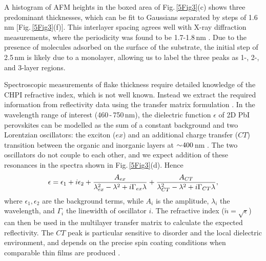 A histogram of AFM heights in the boxed area of Fig.\,\ref{5Fig3}(c) shows three predominant thicknesses, which can be fit to Gaussians separated by steps of 1.6\,nm [Fig.\,\ref{5Fig3}(f)]. This interlayer spacing agrees well with X-ray diffraction measurements, where the periodicity was found to be 1.7-1.8\,nm \cite{Billing2006b, Pradeesh2009a}. Due to the presence of molecules adsorbed on the surface of the substrate, the initial step of 2.5\,nm is likely due to a monolayer, allowing us to label the three peaks as 1-, 2-, and 3-layer regions.  

Spectroscopic measurements of flake thickness require detailed knowledge of the CHPI refractive index, which is not well known. Instead we extract the required information from reflectivity data using the transfer matrix formulation \cite{Born1999}. In the wavelength range of interest (460\,-\,750\,nm), the dielectric function $\epsilon$ of 2D PbI perovskites can be modelled as the sum of a constant background and two Lorentzian oscillators: the exciton ($ex$) and an additional charge transfer ($CT$) transition %
between the organic and inorganic layers %
at $\sim\negmedspace400$\,nm \cite{VijayaPrakash2009, Fujisawa2004, Fujisawa2005, Fujisawa2007, Mitzi1999a, Zhang2010}. %
The two oscillators do not couple to each other, and we expect addition of these resonances in the spectra shown in Fig.\,\ref{5Fig3}(d). %
Hence
\begin{equation}
\centering
\epsilon = \epsilon_1+i\epsilon_2+\frac{A_{ex}}{\lambda_{ex}^2-\lambda^2+i\Gamma_{ex}\lambda}+\frac{A_{CT}}{\lambda_{CT}^2-\lambda^2+i\Gamma_{CT}\lambda} ,
\label{CHPI_model}
\end{equation}
where $\epsilon_1, \epsilon_2$ are the background terms, while $A_i$ is the amplitude, $\lambda_i$ the wavelength, and $\Gamma_i$ the linewidth of oscillator $i$. The refractive index ($\tilde{n} = \sqrt{\epsilon}$) can then be used in the multilayer transfer matrix to calculate the expected reflectivity. The $CT$ peak is particular sensitive to disorder and the local dielectric environment, and depends on the precise spin coating conditions when comparable thin films are produced \cite{VijayaPrakash2009}. 

